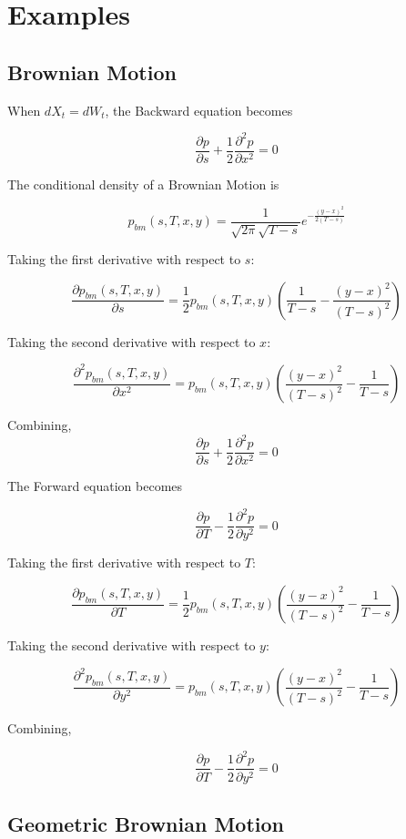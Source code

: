 \documentclass{article}
\theoremstyle{definition}
\begin{document}
\section{Examples}

\subsection{Brownian Motion}

When \(dX_t=dW_t\), the Backward equation becomes

\[\frac{\partial p} {\partial s} + \frac{1}{2} \frac{\partial^2 p}{\partial x^2} =0\]

The conditional density of a Brownian Motion is

\[p_{bm}(s, T, x, y)=\frac{1}{\sqrt{2\pi} \sqrt{T-s}} e^{-\frac{(y-x)^2}{2(T-s)}} \]

Taking the first derivative with respect to \(s\):

\[\frac{\partial p_{bm}(s, T, x, y)}{\partial s}=  \frac{1}{2}p_{bm}(s, T, x, y)\left(\frac{1}{T-s}-\frac{(y-x)^2}{(T-s)^2}\right)  \]

Taking the second derivative with respect to \(x\):

\[\frac{\partial^2 p_{bm}(s, T, x, y)}{\partial x^2}=  p_{bm}(s, T, x, y)\left(\frac{(y-x)^2}{(T-s)^2}-\frac{1}{T-s}\right)  \]

Combining,
\[\frac{\partial p} {\partial s} + \frac{1}{2} \frac{\partial^2 p}{\partial x^2} =0\]

The Forward equation becomes

\[\frac{\partial p} {\partial T} -\frac{1}{2} \frac{\partial^2 p}{\partial y^2} =0\]

Taking the first derivative with respect to \(T\):

\[\frac{\partial p_{bm}(s, T, x, y)}{\partial T}=  \frac{1}{2}p_{bm}(s, T, x, y)\left(\frac{(y-x)^2}{(T-s)^2}-\frac{1}{T-s}\right)  \]

Taking the second derivative with respect to \(y\):

\[\frac{\partial^2 p_{bm}(s, T, x, y)}{\partial y^2}=  p_{bm}(s, T, x, y)\left(\frac{(y-x)^2}{(T-s)^2}-\frac{1}{T-s}\right)  \]

Combining, 

\[\frac{\partial p} {\partial T} -\frac{1}{2} \frac{\partial^2 p}{\partial y^2} =0\]

\subsection{Geometric Brownian Motion}
\end{document}
